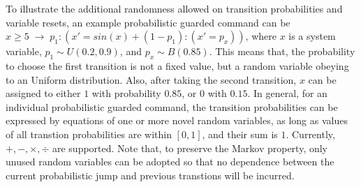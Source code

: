 To illustrate the additional randomness allowed on transition probabilities and variable resets, an example probabilistic guarded command can be $x \geq 5 \; \rightarrow \; p_1:(x' = sin(x) + (1-p_1):(x' = p_x))$, where $x$ is a system variable, $p_1 \sim  U(0.2, 0.9)$, and $p_x  \sim  B(0.85)$. This means that, the probability to choose the first transition is not a fixed value, but a random variable obeying to an Uniform distribution. Also, after taking the second transition, $x$ can be assigned to either $1$ with probability $0.85$, or $0$ with $0.15$. In general, for an individual probabilistic guarded command, the transition probabilities can be expressed by equations of one or more novel random variables, as long as values of all transtion probabilities are within $[0, 1]$, and their sum is $1$. Currently, $+, -, \times, \div$ are supported. Note that, to preserve the Markov property, only unused random variables can be adopted so that no dependence between the current probabilistic jump and previous transtions will be incurred. 





